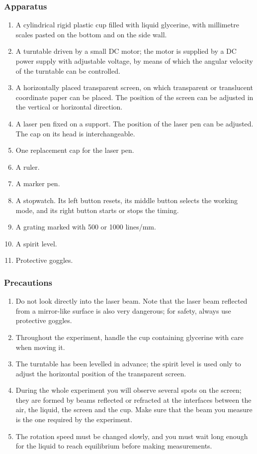 \subsubsection*{Apparatus}

\begin{enumerate}
\item[(1)] A cylindrical rigid plastic cup filled with liquid glycerine, with millimetre scales pasted on the bottom and on the side wall.
\item[(2)] A turntable driven by a small DC motor; the motor is supplied by a DC power supply with adjustable voltage, by means of which the angular velocity of the turntable can be controlled.
\item[(3)] A horizontally placed transparent screen, on which transparent or translucent coordinate paper can be placed. The position of the screen can be adjusted in the vertical or horizontal direction.
\item[(4)] A laser pen fixed on a support. The position of the laser pen can be adjusted. The cap on its head is interchangeable.
\item[(5)] One replacement cap for the laser pen.
\item[(6)] A ruler.
\item[(7)] A marker pen.
\item[(8)] A stopwatch. Its left button resets, its middle button selects the working mode, and its right button starts or stops the timing.
\item[(9)] A grating marked with 500 or 1000 lines/mm.
\item[(10)] A spirit level.
\item[(11)] Protective goggles.
\end{enumerate}

\subsubsection*{Precautions}

\begin{enumerate}
\item[(1)] Do not look directly into the laser beam. Note that the laser beam reflected from a mirror-like surface is also very dangerous; for safety, always use protective goggles.
\item[(2)] Throughout the experiment, handle the cup containing glycerine with care when moving it.
\item[(3)] The turntable has been levelled in advance; the spirit level is used only to adjust the horizontal position of the transparent screen.
\item[(4)] During the whole experiment you will observe several spots on the screen; they are formed by beams reflected or refracted at the interfaces between the air, the liquid, the screen and the cup. Make sure that the beam you measure is the one required by the experiment.
\item[(5)] The rotation speed must be changed slowly, and you must wait long enough for the liquid to reach equilibrium before making measurements.
\end{enumerate}

